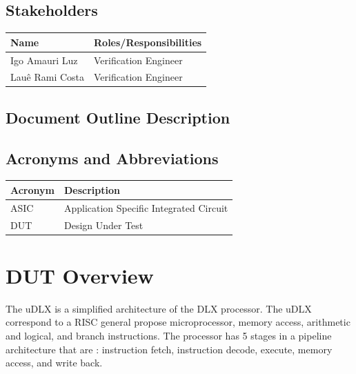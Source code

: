 \documentclass{article}
\begin{document}
	\subsection{Stakeholders}
  \FloatBarrier
  \begin{table}[H] 
    \begin{center}
      \begin{tabular}[pos]{|m{5cm} | m{8cm}|} 
        \hline %
        \cellcolor[gray]{0.9}\textbf{Name} & \cellcolor[gray]{0.9}\textbf{Roles/Responsibilities} \\ \hline
        Igo Amauri Luz & Verification Engineer \\ \hline
        Lauê Rami Costa & Verification Engineer \\ \hline
      \end{tabular}
    \end{center}
  \end{table} 
  
  \subsection{Document Outline Description}	
  
  \subsection{Acronyms and Abbreviations}
  \FloatBarrier
  \begin{table}[H]
    \begin{center}
      \begin{tabular}[pos]{|m{2cm} | m{11cm}|} 
				\hline 
				\cellcolor[gray]{0.9}\textbf{Acronym} & \cellcolor[gray]{0.9}\textbf{Description} \\ \hline
				ASIC 	& Application Specific Integrated Circuit  \\ \hline
				DUT		& Design Under Test \\ \hline
      \end{tabular}
    \end{center}
  \end{table}  

	\newpage
	\section{DUT Overview}
	The  uDLX is a simplified architecture of the DLX processor. The uDLX correspond to a RISC general propose microprocessor, memory access, arithmetic and logical, and branch instructions. The processor has 5 stages in a pipeline architecture that are : instruction fetch, instruction decode, execute, memory access, and write back.
\end{document}
